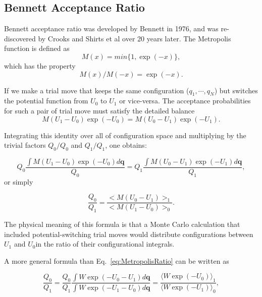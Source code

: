 \subsection{Bennett Acceptance Ratio\label{Sec:FEM:BAR}}
Bennett acceptance ratio was developed by Bennett in 1976,\cite{BennettJComputPhys1976} and was re-discovered by Crooks\cite{CrooksPRE2000} and Shirts et al\cite{ShirtsPRL2003} over 20 years later. The Metropolis function is defined as
\begin{equation}
	M(x)=min\{1,\exp{(-x)}\},
\end{equation}
which has the property 
\begin{equation}
	M(x)/M(-x)=\exp{(-x)}.
\end{equation}

If we make a trial move that keeps the same configuration ($q_{1},\cdots,q_{N}$)
but switches the potential function from $U_{0}$ to $U_{1}$ or vice-versa.
The acceptance probabilities for such a pair of trial move must satisfy
the detailed balance
\begin{equation}
	M(U_{1}-U_{0})\exp{(-U_{0})}=M(U_{0}-U_{1})\exp{(-U_{1})}.
\end{equation}

Integrating this identity over all of configuration space and multiplying
by the trivial factors $Q_{0}/Q_{0}$ and $Q_{1}/Q_{1}$, one obtains:

\begin{equation}
	Q_{0}\frac{\int M(U_{1}-U_{0})\exp{(-U_{0})}d\mathbf{{q}}}{Q_{0}}=Q_{1}\frac{\int M(U_{0}-U_{1})\exp{(-U_{1})}d\mathbf{{q}}}{Q_{1}},
\end{equation}
or simply

\begin{equation}
	\frac{Q_{0}}{Q_{1}}=\frac{<M(U_{0}-U_{1})>_{1}}{<M(U_{1}-U_{0})>_{0}}.\label{eq:MetropolisRatio}
\end{equation}

The physical meaning of this formula is that a Monte Carlo calculation
that included potential-switching trial moves would distribute configurations
between $U_{1}$ and $U_{0}$in the ratio of their configurational
integrals. 

A more general formula than Eq.~\ref{eq:MetropolisRatio} can be written
as

\begin{equation}
	\frac{Q_{0}}{Q_{1}}=\frac{Q_{0}}{Q_{1}}\frac{\int W\exp{(-U_{0}-U_{1})}d\mathbf{{q}}}{\int W\exp{(-U_{1}-U_{0})}d\mathbf{{q}}}=\frac{\langle W\exp{(-U_{0})}\rangle_{1}}{\langle W\exp{(-U_{1})}\rangle_{0}},\label{eq:weightedratio}
\end{equation}

